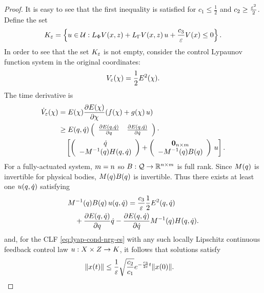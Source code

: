 \documentclass[twocolumn]{article}
\begin{document}
\begin{proof}
  It is easy to see that the first inequality is satisfied for $c_{1} \leq \frac{1}{2}$ and $c_{2} \geq \frac{\varepsilon^{2}}{2}$.
  Define the set
  \begin{align}
    K_{\varepsilon} = \left\{ u \in \mathcal{U} : L_{\Phi} V(x, z) + L_{\Gamma} V(x, z) \, u + \frac{c_{3}}{\varepsilon} V(x) \leq 0 \right\}.
    \label{eq:control-set}
  \end{align}
  In order to see that the set $K_{\varepsilon}$ is not empty, consider the control Lypaunov function system in the original coordinates:
  \begin{align}
    V_{\varepsilon}(\chi) = \frac{1}{2} E^{2}(\chi).
  \end{align}
  The time derivative is
  \begin{align}
    {\dot V}_{\varepsilon}(\chi) &= E(\chi) \frac{\partial{E(\chi)}}{\partial{\chi}}(f(\chi) + g(\chi) \, u)\\
    \nonumber
    &\geq E(q, \dot{q}) \left(\begin{array}{c c}
      \frac{\partial{E(q, \dot{q})}}{\partial{q}} & \frac{\partial{E(q, \dot{q})}}{\partial{\dot{q}}}
    \end{array}\right) \cdot\\
    \nonumber
    & \hspace{1em} \left[
    \left(\begin{array}{c}
      \dot{q}\\
      -M^{-1}(q) H(q, \dot{q})
    \end{array}\right) +
    \left(\begin{array}{c}
      {\mathbf 0}_{n \times m}\\
      -M^{-1}(q) B(q)
    \end{array}\right) \, u
    \right].
  \end{align}
  For a fully-actuated system, $m = n$ so $B : \mathcal{Q} \to \mathbb{R}^{n \times m}$ is full rank.
  Since $M(q)$ is invertible for physical bodies, $M(q) B(q)$ is invertible.
  Thus there exists at least one $u(q, \dot{q})$ satisfying
  \begin{align}
    \lefteqn{\M^{-1}(\q) \B(\q) \, \u(\q, \dq) = \frac{c_{3}}{\resclfparam} \frac{1}{2} \E^{2}(\q, \dq)}\\
    \nonumber
      && \mbox{} + \pd{\E(\q, \dq)}{\q} \dq - \pd{\E(\q, \dq)}{\dq} \M^{-1}(\q) \CG(\q, \dq).
  \end{align}
  and, for the CLF \eqref{eq:lyap-cond-nrg-es} with any such locally Lipschitz continuous feedback control law $u : X \times Z \to K$, it follows that solutions satisfy
  \begin{align*}
    \| x(t) \| \leq \frac{1}{\varepsilon} \sqrt{\frac{c_{2}}{c_{1}}} e^{-\frac{c_{3}}{2\varepsilon} t} \| x(0) \|. & \qedhere
  \end{align*}
\end{proof}
\end{document}

